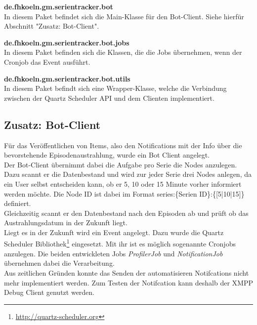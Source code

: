 \textbf{de.fhkoeln.gm.serientracker.bot}\\
In diesem Paket befindet sich die Main-Klasse für den Bot-Client. Siehe hierfür Abschnitt "Zusatz: Bot-Client".

\textbf{de.fhkoeln.gm.serientracker.bot.jobs}\\
In diesem Paket befinden sich die Klassen, die die Jobs übernehmen, wenn der Cronjob das Event ausführt.

\textbf{de.fhkoeln.gm.serientracker.bot.utils}\\
In diesem Paket befindt sich eine Wrapper-Klasse, welche die Verbindung zwischen der Quartz Scheduler API und dem Clienten implementiert.

\newpage

\subsection{Zusatz: Bot-Client}

Für das Veröffentlichen von Items, also den Notifications mit der Info über die bevorstehende Episodenaustrahlung, wurde ein Bot Client angelegt.\\
Der Bot-Client übernimmt dabei die Aufgabe pro Serie die Nodes anzulegen. Dazu scannt er die Datenbestand und wird zur jeder Serie drei Nodes anlegen, da ein User selbst entscheiden kann, ob er 5, 10 oder 15 Minute vorher informiert werden möchte. Die Node ID ist dabei im Format \textsf{series:\{Serien ID\}:\{[5|10|15]\}} definiert.\\
Gleichzeitig scannt er den Datenbestand nach den Episoden ab und prüft ob das Austrahlungsdatum in der Zukunft liegt.\\
Liegt es in der Zukunft wird ein Event angelegt. Dazu wurde die Quartz Scheduler Bibliothek\footnote{\url{http://quartz-scheduler.org}} eingesetzt. Mit ihr ist es möglich sogenannte Cronjobs anzulegen. Die beiden entwickleten Jobs \textit{ProfilerJob} und \textit{NotificationJob} übernehmen dabei die Verarbeitung.\\

Aus zeitlichen Gründen konnte  das Senden der automatisieren Notifcations nicht mehr implementiert werden. Zum Testen der Notifcation kann deshalb der XMPP Debug Client genutzt werden.
